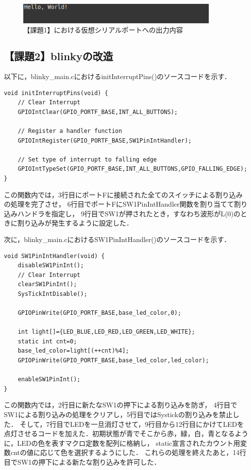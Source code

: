 \documentclass{jlreq}
\begin{document}
\begin{figure}
    \centering
    \includegraphics[width=0.9\textwidth]{Hello.png}
    \caption{【課題1】における仮想シリアルポートへの出力内容}
    \label{fig:Hello_World}
\end{figure}

\subsection{【課題2】blinkyの改造}
以下に，blinky\_main.cにおけるinitInterruptPins()のソースコードを示す．

\begin{lstlisting}[label=a2initInt,caption={【課題2】におけるinitInterruptPins関数}]
void initInterruptPins(void) {
    // Clear Interrupt
    GPIOIntClear(GPIO_PORTF_BASE,INT_ALL_BUTTONS);

    // Register a handler function
    GPIOIntRegister(GPIO_PORTF_BASE,SW1PinIntHandler);

    // Set type of interrupt to falling edge
    GPIOIntTypeSet(GPIO_PORTF_BASE,INT_ALL_BUTTONS,GPIO_FALLING_EDGE);
}
\end{lstlisting}

この関数内では，3行目にポートFに接続された全てのスイッチによる割り込みの処理を完了させ，
6行目でポートFにSW1PinIntHandler関数を割り当てて割り込みハンドラを指定し，
9行目でSW1が押されたとき，すなわち波形がL(0)のときに割り込みが発生するように設定した．

次に，blinky\_main.cにおけるSW1PinIntHandler()のソースコードを示す．

\begin{lstlisting}[label=a2SW1Int,caption={【課題2】におけるSW1PinIntHandler関数}]
void SW1PinIntHandler(void) {
    disableSW1PinInt();
    // Clear Interrupt
    clearSW1PinInt();
    SysTickIntDisable();

    GPIOPinWrite(GPIO_PORTF_BASE,base_led_color,0);

    int light[]={LED_BLUE,LED_RED,LED_GREEN,LED_WHITE};
    static int cnt=0;
    base_led_color=light[(++cnt)%4];
    GPIOPinWrite(GPIO_PORTF_BASE,base_led_color,led_color);

    enableSW1PinInt();
}
\end{lstlisting}

この関数内では，2行目に新たなSW1の押下による割り込みを防ぎ，
4行目でSW1による割り込みの処理をクリアし，5行目ではSystickの割り込みを禁止した．
そして，7行目でLEDを一旦消灯させて，9行目から12行目にかけてLEDを点灯させるコードを加えた．初期状態が青でそこから赤，緑，白，青となるように，LEDの色を表すマクロ定数を配列に格納し，
static宣言されたカウント用変数cntの値に応じて色を選択するようにした．
これらの処理を終えたあと，14行目でSW1の押下による新たな割り込みを許可した．
\end{document}
